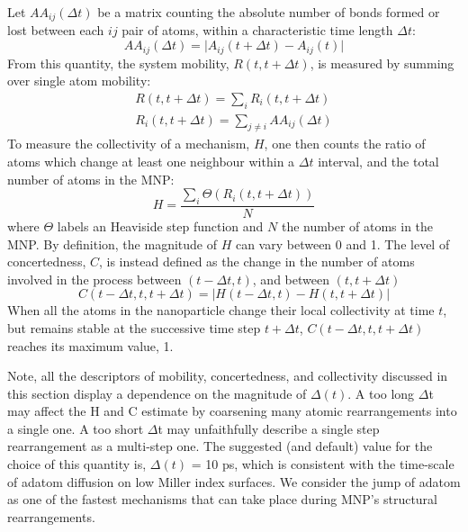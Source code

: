Let $AA_{ij}(\Delta t)$ be
a matrix counting the absolute number of bonds formed or lost between each $ij$ pair of atoms, within a characteristic time length $\Delta t$:
\begin{equation}
    AA_{ij} \left( \Delta t \right) = \vert A_{ij} \left( t + \Delta t \right) - A_{ij}(t) \vert
\end{equation}
From this quantity, the system mobility, $R(t, t + \Delta t)$, is measured by summing over single atom mobility:
\begin{eqnarray}
 \nonumber   R(t, t +\Delta t) =\sum_i R_i(t, t +\Delta t)
\\
R_i(t, t + \Delta t) = \sum_{j\ne i} AA_{ij} (\Delta t)
\end{eqnarray}
%
To measure the collectivity of a mechanism, $H$, one then counts the ratio of atoms which change at least one neighbour within a  $\Delta t$  interval, and the total number of atoms in the MNP:
\begin{equation}
    H = \frac{ \sum_i \Theta (R_i(t, t +\Delta t)) }{N}
\end{equation}
where $\Theta$ labels an Heaviside step function and $N$ the number of atoms in the MNP.
%
By definition, the magnitude of $H$ can vary between 0 and 1.
%
The level of concertedness, $C$, is instead defined as the change in the number of atoms involved in the process between $(t - \Delta t, t)$, and between $(t, t + \Delta t)$
\begin{equation}
    C(t - \Delta t, t, t + \Delta t) = \vert H(t - \Delta t, t) - H(t, t + \Delta t) \vert
\end{equation}
%
When all the atoms in the nanoparticle change their local collectivity at time $t$, but remains stable at the successive time step $t +\Delta t$, $C(t - \Delta t, t, t +\Delta t)$ reaches its maximum value,  1.
%

Note, all the descriptors of mobility, concertedness, and collectivity discussed in this section display a dependence on the magnitude of $\Delta(t)$.
A too long $\Delta$t may affect the H and C estimate by coarsening many atomic rearrangements into a single one. 
A too short $\Delta$t may unfaithfully describe a single step rearrangement as a multi-step one.
%
The suggested (and default) value for the choice of this quantity is, $\Delta (t)$ = 10 ps, which is consistent with the time-scale of adatom diffusion on low Miller index surfaces. 
We consider the jump of adatom as one of the fastest  mechanisms that can take place during MNP's structural rearrangements.

